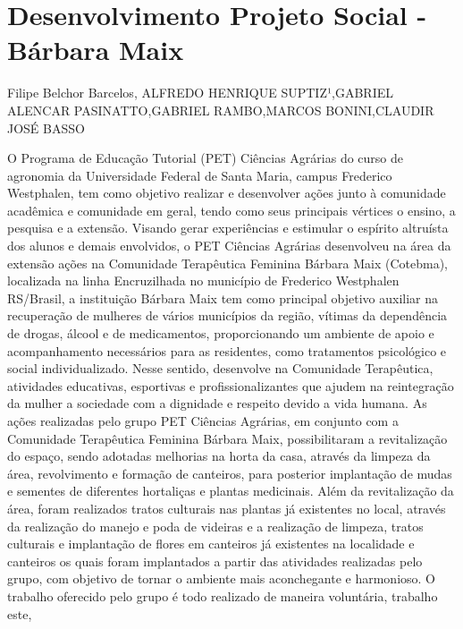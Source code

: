 


\section*{Desenvolvimento Projeto Social - Bárbara Maix}

Filipe Belchor Barcelos, ALFREDO HENRIQUE SUPTIZ¹,GABRIEL ALENCAR PASINATTO,GABRIEL RAMBO,MARCOS BONINI,CLAUDIR JOSÉ BASSO

O Programa de Educação Tutorial (PET) Ciências Agrárias do curso de agronomia da
Universidade Federal de Santa Maria, campus Frederico Westphalen, tem como objetivo realizar
e desenvolver ações junto à comunidade acadêmica e comunidade em geral, tendo como seus
principais vértices o ensino, a pesquisa e a extensão. Visando gerar experiências e estimular o
espírito altruísta dos alunos e demais envolvidos, o PET Ciências Agrárias desenvolveu na área
da extensão ações na Comunidade Terapêutica Feminina Bárbara Maix (Cotebma), localizada na
linha Encruzilhada no município de Frederico Westphalen RS/Brasil, a instituição Bárbara Maix
tem como principal objetivo auxiliar na recuperação de mulheres de vários municípios da região,
vítimas da dependência de drogas, álcool e de medicamentos, proporcionando um ambiente de
apoio e acompanhamento necessários para as residentes, como tratamentos psicológico e social
individualizado. Nesse sentido, desenvolve na Comunidade Terapêutica, atividades educativas,
esportivas e profissionalizantes que ajudem na reintegração da mulher a sociedade com a
dignidade e respeito devido a vida humana.
As ações realizadas pelo grupo PET Ciências Agrárias, em conjunto com a Comunidade
Terapêutica Feminina Bárbara Maix, possibilitaram a revitalização do espaço, sendo adotadas
melhorias na horta da casa, através da limpeza da área, revolvimento e formação de canteiros,
para posterior implantação de mudas e sementes de diferentes hortaliças e plantas medicinais.
Além da revitalização da área, foram realizados tratos culturais nas plantas já existentes no local,
através da realização do manejo e poda de videiras e a realização de limpeza, tratos culturais e
implantação de flores em canteiros já existentes na localidade e canteiros os quais foram
implantados a partir das atividades realizadas pelo grupo, com objetivo de tornar o ambiente
mais aconchegante e harmonioso.
O trabalho oferecido pelo grupo é todo realizado de maneira voluntária, trabalho este,

